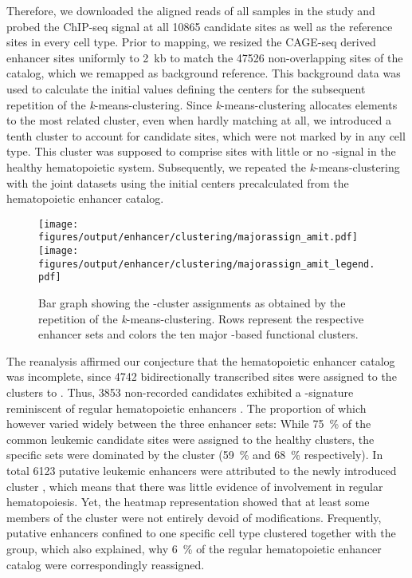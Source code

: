 Therefore, we downloaded the aligned reads of all samples in the study and probed the ChIP-seq signal at all \num{10865} candidate sites as well as the reference sites in every cell type. Prior to mapping, we resized the CAGE-seq derived enhancer sites uniformly to \SI{2}{\kilo b} to match the \num{47526} non-overlapping sites of the catalog, which we remapped as background reference. This background data was used to calculate the initial values defining the centers for the subsequent repetition of the \hisfourone \textsl{k}-means-clustering. Since \textsl{k}-means-clustering allocates elements to the most related cluster, even when hardly matching at all, we introduced a tenth cluster \amitten to account for candidate sites, which were not marked by \hisfourone in any cell type. This cluster was supposed to comprise sites with little or no \hisfourone-signal in the healthy hematopoietic system. Subsequently, we repeated the \textsl{k}-means-clustering with the joint datasets using the initial centers precalculated from the hematopoietic enhancer catalog\supplefig. 

\begin{figure}[!htb]
	\centering
	\texttt{[image: figures/output/enhancer/clustering/majorassign\_amit.pdf]} 
	\texttt{[image: figures/output/enhancer/clustering/majorassign\_amit\_legend.pdf]} 
	\caption{Bar graph showing the \hisfourone-cluster assignments as obtained by the repetition of the \textsl{k}-means-clustering. Rows represent the respective enhancer sets and colors the ten major \hisfourone-based functional clusters.}
	\label{fig:enhancers:majorassign_amit}
\end{figure}

The reanalysis affirmed our conjecture that the hematopoietic enhancer catalog was incomplete, since \num{4742} bidirectionally transcribed sites were assigned to the clusters  to . Thus, \num{3853} non-recorded candidates exhibited a \hisfourone-signature reminiscent of regular hematopoietic enhancers . The proportion of which however varied widely between the three enhancer sets: While \SI{75}{\percent} of the common leukemic candidate sites were assigned to the healthy clusters, the specific sets were dominated by the \amitten cluster (\SI{59}{\percent} and \SI{68}{\percent} respectively). In total \num{6123} putative \mllafnine leukemic enhancers were attributed to the newly introduced cluster , which means that there was little evidence of involvement in regular hematopoiesis. Yet, the heatmap representation \supple showed that at least some members of the \amitten cluster were not entirely devoid of \hisfourone modifications. Frequently, putative enhancers confined to one specific cell type clustered together with the \amitten group, which also explained, why \SI{6}{\percent} of the regular hematopoietic enhancer catalog were correspondingly reassigned. 

